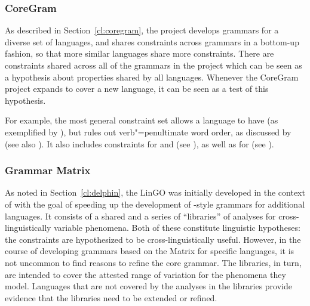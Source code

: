 \documentclass[output=paper
                ,modfonts
                ,nonflat
	        ,collection
	        ,collectionchapter
	        ,collectiontoclongg
 	        ,biblatex
                ,babelshorthands
                ,newtxmath
                ,draftmode
                ,colorlinks, citecolor=brown
]{./langsci/langscibook}
\begin{document}


\subsubsection{CoreGram}
\label{cl:lang-doc:coregram}

As described in Section~\ref{cl:coregram},
the  project develops grammars for a diverse set of languages,
and shares constraints across grammars in a bottom-up fashion, so that more
similar languages share more constraints. There are constraints
shared across all of the grammars in the project which can be seen
as a hypothesis about properties shared by all languages.
Whenever the CoreGram project expands to cover a new language,
it can be seen as a test of this hypothesis.

For example, the most general constraint set
allows a language to have 
(as exemplified by ),
but rules out verb"=penultimate word order,
as discussed by \citet{MuellerCoreGram}
(see also ).
It also includes constraints for  and 
(see ),
as well as for 
(see ).



\subsubsection{Grammar Matrix}
\label{cl:lang-doc:gmcs}

As noted in Section~\ref{cl:delphin}, the LinGO 
\citep{BFO2002a-u,BDFPS2010a-u} was initially developed in
the context of  with the goal of speeding up the
development of \delphin-style grammars for additional languages.
It consists of a shared 
and a series of ``libraries''
of analyses for cross-linguistically variable phenomena.
Both of these constitute linguistic hypotheses:
the constraints are hypothesized to be cross-linguistically useful.
However, in the course of developing grammars based on the
Matrix for specific languages, it is not uncommon to find reasons to
refine the core grammar. The libraries, in turn, are intended to 
cover the attested range of variation for the phenomena they model.
Languages that are not covered by the analyses in the libraries provide
evidence that the libraries need to be extended or refined. 
\end{document}
